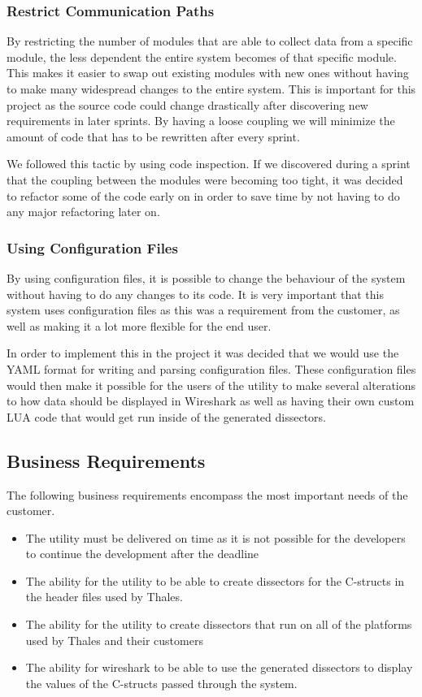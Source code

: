 \subsubsection{Restrict Communication Paths}
By restricting the number of modules that are able to collect data from a specific module, the less dependent the entire system becomes of that specific module. This makes it easier to swap out existing modules with new ones without having to make many widespread changes to the entire system. This is important for this project as the source code could change drastically after discovering new requirements in later sprints. By having a loose coupling we will minimize the amount of code that has to be rewritten after every sprint.

We followed this tactic by using code inspection. If we discovered during a sprint that the coupling between the modules were becoming too tight, it was decided to refactor some of the code early on in order to save time by not having to do any major refactoring later on.

\subsubsection{Using Configuration Files}
By using configuration files, it is possible to change the behaviour of the system without having to do any changes to its code. It is very important that this system uses configuration files as this was a requirement from the customer, as well as making it a lot more flexible for the end user.

In order to implement this in the project it was decided that we would use the YAML format for writing and parsing configuration files. These configuration files would then make it possible for the users of the utility to make several alterations to how data should be displayed in Wireshark as well as having their own custom LUA code that would get run inside of the generated dissectors.

\subsection{Business Requirements}
The following business requirements encompass the most important needs of the customer.
\begin{itemize}
\item The \gls{utility} must be delivered on time as it is not possible for the developers to continue the development after the deadline
\item The ability for the \gls{utility} to be able to create dissectors for the C-structs in the header files used  by Thales.
\item The ability for the \gls{utility} to create dissectors that run on all of the platforms used by Thales and their customers
\item The ability for \Gls{wireshark} to be able to use the generated dissectors to display the values of the C-structs passed through the system.
\end{itemize}

